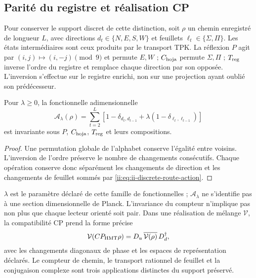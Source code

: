 \subsection{Parité du registre et réalisation CP}

Pour conserver le support discret de cette distinction, soit \(\rho\) un
chemin enregistré de longueur \(L\), avec directions
\(d_t\in\{N,E,S,W\}\) et feuillets \(\ell_t\in\{\Sigma,\Pi\}\).
Les états intermédiaires sont ceux produits par le transport TPK.
La réflexion \(P\) agit par \((i,j)\mapsto(i,-j)\pmod9\) et
permute \(E,W\) ; \(C_{\rm hoja}\) permute \(\Sigma,\Pi\) ;
\(T_{\rm reg}\) inverse l'ordre du registre et remplace chaque
direction par son opposée. L'inversion s'effectue sur le registre
enrichi, non sur une projection ayant oublié son prédécesseur.

\begin{proposition}
Pour \(\lambda\ge0\), la fonctionnelle adimensionnelle
\begin{equation}
 \mathcal A_\lambda(\rho)=
 \sum_{t=2}^{L}\left[1-\delta_{d_t,d_{t-1}}
             +\lambda(1-\delta_{\ell_t,\ell_{t-1}})\right]
 \label{ii:eq:ii-discrete-route-action}
\end{equation}
est invariante sous \(P\), \(C_{\rm hoja}\), \(T_{\rm reg}\) et
leurs compositions.
\end{proposition}

\begin{proof}
Une permutation globale de l'alphabet conserve l'égalité entre voisins.
L'inversion de l'ordre préserve le nombre de changements consécutifs.
Chaque opération conserve donc séparément les changements de direction
et les changements de feuillet sommés par \eqref{ii:eq:ii-discrete-route-action}.
\end{proof}

\(\lambda\) est le paramètre déclaré de cette famille de fonctionnelles ;
\(\mathcal A_\lambda\) ne s'identifie pas à une section dimensionnelle de
Planck. L'invariance du compteur n'implique pas non plus que chaque lecteur
orienté soit pair. Dans une réalisation de mélange \(\mathcal V\), la
compatibilité CP prend la forme précise
\begin{equation}
 \mathcal V(CP_{\rm HMT}\rho)
 =D_u\,\overline{\mathcal V(\rho)}\,D_d^\dagger,
 \label{ii:eq:ii-cp-square}
\end{equation}
avec les changements diagonaux de phase et les espaces de représentation
déclarés. Le compteur de chemin, le transport rationnel de feuillet et la
conjugaison complexe sont trois applications distinctes du support préservé.

